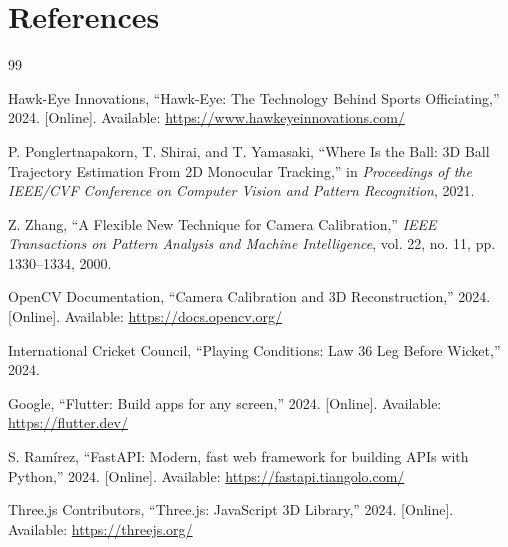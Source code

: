 \documentclass[12pt,a4paper]{article}
\begin{document}
\section{References}

\begin{thebibliography}{99}

Hawk-Eye Innovations, ``Hawk-Eye: The Technology Behind Sports Officiating,'' 2024. [Online]. Available: \url{https://www.hawkeyeinnovations.com/}

P. Ponglertnapakorn, T. Shirai, and T. Yamasaki, ``Where Is the Ball: 3D Ball Trajectory Estimation From 2D Monocular Tracking,'' in \textit{Proceedings of the IEEE/CVF Conference on Computer Vision and Pattern Recognition}, 2021.

Z. Zhang, ``A Flexible New Technique for Camera Calibration,'' \textit{IEEE Transactions on Pattern Analysis and Machine Intelligence}, vol. 22, no. 11, pp. 1330--1334, 2000.

OpenCV Documentation, ``Camera Calibration and 3D Reconstruction,'' 2024. [Online]. Available: \url{https://docs.opencv.org/}

International Cricket Council, ``Playing Conditions: Law 36 Leg Before Wicket,'' 2024.

Google, ``Flutter: Build apps for any screen,'' 2024. [Online]. Available: \url{https://flutter.dev/}

S. Ram\'{i}rez, ``FastAPI: Modern, fast web framework for building APIs with Python,'' 2024. [Online]. Available: \url{https://fastapi.tiangolo.com/}

Three.js Contributors, ``Three.js: JavaScript 3D Library,'' 2024. [Online]. Available: \url{https://threejs.org/}

\end{thebibliography}
\end{document}
